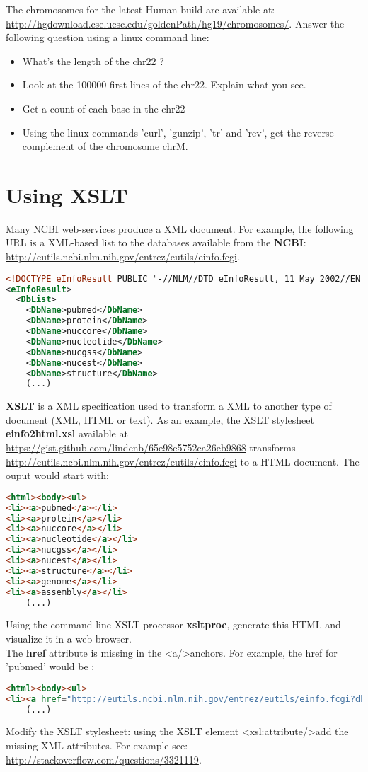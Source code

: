 \documentclass{article}
\begin{document}
The chromosomes for the latest Human build are available at: \url{http://hgdownload.cse.ucsc.edu/goldenPath/hg19/chromosomes/}. Answer the following question using a linux command line:
\begin{itemize}
\item What's the length of the chr22 ?
\item Look at the 100000 first lines of the chr22. Explain what you see.
\item Get a count of each base in the chr22
\item Using the linux commands 'curl', 'gunzip', 'tr' and 'rev', get the reverse complement of the chromosome chrM.
\end{itemize}


\section{Using XSLT}
Many NCBI web-services produce a XML document. For example, the following URL is a XML-based list to the databases available from the  \textbf{NCBI}: \url{http://eutils.ncbi.nlm.nih.gov/entrez/eutils/einfo.fcgi}.\\
\begin{lstlisting}[language=xml]
<!DOCTYPE eInfoResult PUBLIC "-//NLM//DTD eInfoResult, 11 May 2002//EN" "http://www.ncbi.nlm.nih.gov/entrez/query/DTD/eInfo_020511.dtd">
<eInfoResult>
  <DbList>
    <DbName>pubmed</DbName>
    <DbName>protein</DbName>
    <DbName>nuccore</DbName>
    <DbName>nucleotide</DbName>
    <DbName>nucgss</DbName>
    <DbName>nucest</DbName>
    <DbName>structure</DbName>
    (...)
\end{lstlisting}
\textbf{XSLT} is a XML specification used to transform a XML to another type of document (XML, HTML or text).
As an example, the XSLT stylesheet \textbf{einfo2html.xsl} available at \url{https://gist.github.com/lindenb/65e98e5752ea26eb9868} transforms  \url{http://eutils.ncbi.nlm.nih.gov/entrez/eutils/einfo.fcgi} to a HTML document. The ouput would start with:\\
\begin{lstlisting}[language=html]
<html><body><ul>
<li><a>pubmed</a></li>
<li><a>protein</a></li>
<li><a>nuccore</a></li>
<li><a>nucleotide</a></li>
<li><a>nucgss</a></li>
<li><a>nucest</a></li>
<li><a>structure</a></li>
<li><a>genome</a></li>
<li><a>assembly</a></li>
    (...)
\end{lstlisting} 
\noindent
Using the command line XSLT processor \textbf{xsltproc}, generate this HTML and visualize it in a web browser.\\
The \textbf{href} attribute is missing in the \textless{}a/\textgreater  anchors. For example, the href for 'pubmed' would be :

\begin{lstlisting}[language=html]
<html><body><ul>
<li><a href="http://eutils.ncbi.nlm.nih.gov/entrez/eutils/einfo.fcgi?db=pubmed">pubmed</a></li>
    (...)
\end{lstlisting} 
\noindent
Modify the XSLT stylesheet: using the XSLT element \textless{}xsl:attribute/\textgreater  add the missing XML attributes. For example see: \url{http://stackoverflow.com/questions/3321119}.
\end{document}
